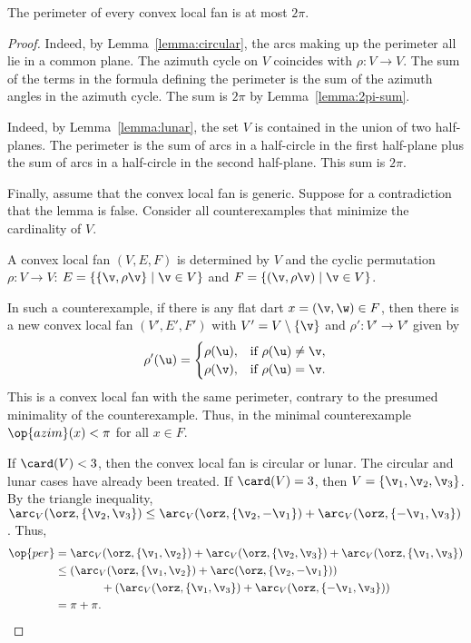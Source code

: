 \begin{lemma}
\label{lemma:convex-hyp}
The perimeter of every convex local fan is at most $2\pi$.  
\end{lemma}
%
%

\begin{proof} 
  Indeed, by Lemma~\ref{lemma:circular},
the arcs making up the perimeter all lie in a common plane.  The
azimuth cycle on $V$ coincides with $\rho:V\to V$.  The sum of the
terms in the formula defining the perimeter is the sum of the
azimuth angles in the azimuth cycle.  The sum is $2\pi$ by
Lemma~\ref{lemma:2pi-sum}.


  Indeed, by Lemma~\ref{lemma:lunar}, the
set $V$ is contained in the union of two half-planes.  The perimeter
is the sum of arcs in a half-circle in the first half-plane plus the
sum of arcs in a half-circle in the second half-plane. This sum is
$2\pi$.

Finally, assume that the convex local fan is generic.  Suppose for a
contradiction that the lemma is false.  Consider all counterexamples
that minimize the cardinality of $V$.  

A convex local fan $(V,E,F)$ is determined by $V$ and the cyclic
permutation $\rho:V\to V$: $E=\{\{\v,\rho \v\}\mid \v\in V\}$ and $F
= \{(\v,\rho \v)\mid \v\in V\}$.

In such a counterexample, if there is any flat dart $x=(\v,\w)\in F$,
then there is a new convex local fan $(V',E',F')$ with $V' =
V\setminus\{\v\}$ and $\rho':V'\to V'$ given by
\[ 
\rho'(\u) = \begin{cases}
\rho(\u), & \text{if } \rho(\u)\ne \v,\\
\rho(\v), & \text{if }\rho(\u) = \v.\\
\end{cases}
\] 
This is a convex local fan with the same perimeter, contrary to the presumed
minimality of the counterexample.  Thus, in the minimal counterexample
$\op{azim}(x) <\pi$ for all $x\in F$.

If $\card(V) <3$, then the convex local fan is circular or lunar.  The
circular and lunar cases have 
already been treated.  If $\card(V)=3$, then $V=\{\v_1,\v_2,\v_3\}$.
By the triangle inequality, $\arc_V(\orz,\{\v_2,\v_3\}) \le
\arc_V(\orz,\{\v_2,-\v_1\})+\arc_V(\orz,\{-\v_1,\v_3\})$.  Thus,
\begin{align*}
  \op{per} &=\arc_V(\orz,\{\v_1,\v_2\}) 
  + \arc_V(\orz,\{\v_2,\v_3\}) 
  + \arc_V(\orz,\{\v_1,\v_3\})\\
  &\le(\arc_V(\orz,\{\v_1,\v_2\})+\arc(\orz,\{\v_2,-\v_1\}))
  \\&\qquad\qquad+(\arc_V(\orz,\{\v_1,\v_3\})
+\arc_V(\orz,\{-\v_1,\v_3\})) \\
  &= \pi+\pi.
\end{align*}


\end{proof}
